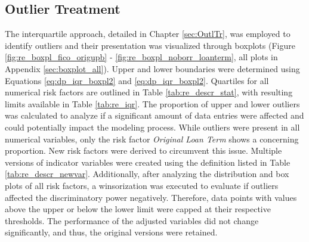 \subsection{Outlier Treatment}
The interquartile approach, detailed in Chapter \ref{sec:OutlTr}, was employed to identify outliers and their presentation was visualized through boxplots (Figure \ref{fig:re_boxpl_fico_origupb} - \ref{fig:re_boxpl_noborr_loanterm}, all plots in Appendix \ref{sec:boxplot_all}). Upper and lower boundaries were determined using Equations \ref{eq:dp_iqr_boxpl2} and \ref{eq:dp_iqr_boxpl2}. Quartiles for all numerical risk factors are outlined in Table \ref{tab:re_descr_stat}, with resulting limits available in Table \ref{tab:re_iqr}. The proportion of upper and lower outliers was calculated to analyze if a significant amount of data entries were affected and could potentially impact the modeling process. While outliers were present in all numerical variables, only the risk factor \emph{Original Loan Term} shows a concerning proportion. New risk factors were derived to circumvent this issue. Multiple versions of indicator variables were created using the definition listed in Table \ref{tab:re_descr_newvar}. Additionally, after analyzing the distribution and box plots of all risk factors, a winsorization was executed to evaluate if outliers affected the discriminatory power negatively. Therefore, data points with values above the upper or below the lower limit were capped at their respective thresholds. The performance of the adjusted variables did not change significantly, and thus, the original versions were retained.

